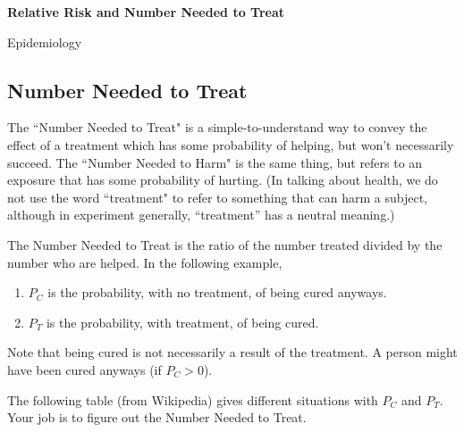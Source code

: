\documentclass{article}
\begin{document}
\raggedright
\centerline{\Large \bfseries Relative Risk and Number Needed to Treat}

\bigskip

\centerline{\large \sf Epidemiology}

\bigskip

\begin{multicols}{2}
\subsection*{Number Needed to Treat}

The ``Number Needed to Treat" is a simple-to-understand way to convey the effect of a treatment which has some probability of helping, but won't necessarily succeed.  The ``Number Needed to Harm" is the same thing, but refers to an exposure that has some probability of hurting.  (In talking about health, we do not use the word ``treatment" to refer to something that can harm a subject, although in experiment generally, ``treatment'' has a neutral meaning.)

The Number Needed to Treat is the ratio of the number treated divided by the number who are helped.  In the following example, 
\begin{enumerate}
\item $P_C$ is the probability, with no treatment, of being cured anyways.  
\item $P_T$ is the probability, with  treatment, of being cured.
\end{enumerate}
Note that being cured is not necessarily a result of the treatment.  A person might have been cured anyways (if $P_C > 0$).

The following table (from Wikipedia) gives different situations with $P_C$ and $P_T$.  Your job is to figure out the Number Needed to Treat.
\end{multicols}
\end{document}
